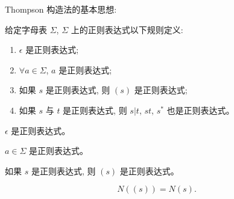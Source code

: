 \begin{frame}{}
  \begin{center}
    Thompson 构造法的基本思想: 
  \end{center}

  \begin{definition}[正则表达式]
    给定字母表 $\Sigma$, $\Sigma$ 上的正则表达式以下规则定义:
    \begin{enumerate}[(1)]
      \item $\epsilon$ 是正则表达式;
      \item $\forall a \in \Sigma$, $a$ 是正则表达式;
      \item 如果 $s$ 是正则表达式, 则 $(s)$ 是正则表达式;
      \item 如果 $s$ 与 $t$ 是正则表达式, 则 $s|t$, $st$, $s^{\ast}$ 也是正则表达式。
    \end{enumerate}
  \end{definition}
\end{frame}

\begin{frame}{}
  \begin{center}
    $\epsilon$ 是正则表达式。

    \pause
    \vspace{0.80cm}
  \end{center}
\end{frame}

\begin{frame}{}
  \begin{center}
    $a \in \Sigma$ 是正则表达式。

    \pause
    \vspace{0.80cm}
  \end{center}
\end{frame}

\begin{frame}{}
  \begin{center}
    如果 $s$ 是正则表达式, 则 $(s)$ 是正则表达式。

    \pause
    \vspace{0.60cm}
    \[
      N((s)) = N(s).
    \]
  \end{center}
\end{frame}

